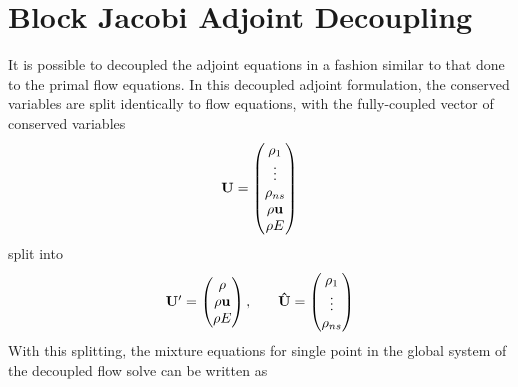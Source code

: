 \section{Block Jacobi Adjoint Decoupling}
\label{block-jacobi-decoupling}

It is possible to decoupled the adjoint equations in a fashion similar to that
done to the primal flow equations.  In this decoupled adjoint formulation, the
conserved variables are split identically to flow equations, with the
fully-coupled vector of conserved variables
\begin{equation}
	\mathbf U =
  \begin{pmatrix}
 		\rho_1    \\
		\vdots    \\
		\rho_{ns} \\
    \rho \mathbf u  \\
		\rho E    \\
	\end{pmatrix}
  \label{all-vars}
 \end{equation}
 split into
\begin{equation}
	\begin{matrix}
		\mathbf{U}'=\begin{pmatrix}
			\rho \\
			\rho \mathbf u \\
			\rho E
		\end{pmatrix},\quad &
		\mathbf{\hat{U}}=\begin{pmatrix}
			\rho_1 \\
			\vdots \\
			\rho_{ns}
		\end{pmatrix}
	\end{matrix}
  \label{dc-vars}
\end{equation}
With this splitting, the mixture equations for single point in the global system
of the decoupled flow solve can be written as
